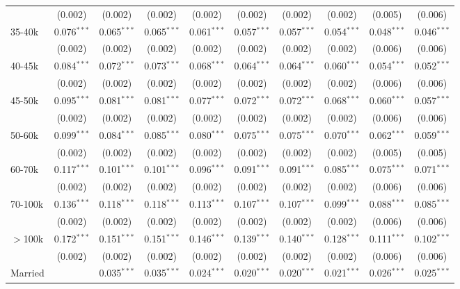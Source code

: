\begin{table}[!htbp]
{\begin{tabular}{@{\extracolsep{5pt}}lccccccccc}
  & (0.002) & (0.002) & (0.002) & (0.002) & (0.002) & (0.002) & (0.002) & (0.005) & (0.006) \\
  35-40k & 0.076$^{***}$ & 0.065$^{***}$ & 0.065$^{***}$ & 0.061$^{***}$ & 0.057$^{***}$ & 0.057$^{***}$ & 0.054$^{***}$ & 0.048$^{***}$ & 0.046$^{***}$ \\
  & (0.002) & (0.002) & (0.002) & (0.002) & (0.002) & (0.002) & (0.002) & (0.006) & (0.006) \\
  40-45k & 0.084$^{***}$ & 0.072$^{***}$ & 0.073$^{***}$ & 0.068$^{***}$ & 0.064$^{***}$ & 0.064$^{***}$ & 0.060$^{***}$ & 0.054$^{***}$ & 0.052$^{***}$ \\
  & (0.002) & (0.002) & (0.002) & (0.002) & (0.002) & (0.002) & (0.002) & (0.006) & (0.006) \\
  45-50k & 0.095$^{***}$ & 0.081$^{***}$ & 0.081$^{***}$ & 0.077$^{***}$ & 0.072$^{***}$ & 0.072$^{***}$ & 0.068$^{***}$ & 0.060$^{***}$ & 0.057$^{***}$ \\
  & (0.002) & (0.002) & (0.002) & (0.002) & (0.002) & (0.002) & (0.002) & (0.006) & (0.006) \\
  50-60k & 0.099$^{***}$ & 0.084$^{***}$ & 0.085$^{***}$ & 0.080$^{***}$ & 0.075$^{***}$ & 0.075$^{***}$ & 0.070$^{***}$ & 0.062$^{***}$ & 0.059$^{***}$ \\
  & (0.002) & (0.002) & (0.002) & (0.002) & (0.002) & (0.002) & (0.002) & (0.005) & (0.005) \\
  60-70k & 0.117$^{***}$ & 0.101$^{***}$ & 0.101$^{***}$ & 0.096$^{***}$ & 0.091$^{***}$ & 0.091$^{***}$ & 0.085$^{***}$ & 0.075$^{***}$ & 0.071$^{***}$ \\
  & (0.002) & (0.002) & (0.002) & (0.002) & (0.002) & (0.002) & (0.002) & (0.006) & (0.006) \\
  70-100k & 0.136$^{***}$ & 0.118$^{***}$ & 0.118$^{***}$ & 0.113$^{***}$ & 0.107$^{***}$ & 0.107$^{***}$ & 0.099$^{***}$ & 0.088$^{***}$ & 0.085$^{***}$ \\
  & (0.002) & (0.002) & (0.002) & (0.002) & (0.002) & (0.002) & (0.002) & (0.006) & (0.006) \\
  $>$100k & 0.172$^{***}$ & 0.151$^{***}$ & 0.151$^{***}$ & 0.146$^{***}$ & 0.139$^{***}$ & 0.140$^{***}$ & 0.128$^{***}$ & 0.111$^{***}$ & 0.102$^{***}$ \\
  & (0.002) & (0.002) & (0.002) & (0.002) & (0.002) & (0.002) & (0.002) & (0.006) & (0.006) \\
  Married &  & 0.035$^{***}$ & 0.035$^{***}$ & 0.024$^{***}$ & 0.020$^{***}$ & 0.020$^{***}$ & 0.021$^{***}$ & 0.026$^{***}$ & 0.025$^{***}$ \\

\end{tabular}}
\end{table}
